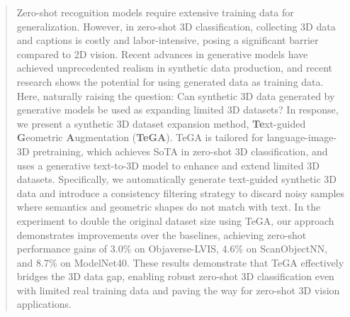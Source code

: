 \begin{abstract}

Zero-shot recognition models require extensive training data for generalization.
However, in zero-shot 3D classification, collecting 3D data and captions is costly and labor-intensive, posing a significant barrier compared to 2D vision.
Recent advances in generative models have achieved unprecedented realism in synthetic data production, and recent research shows the potential for using generated data as training data.
Here, naturally raising the question: Can synthetic 3D data generated by generative models be used as expanding limited 3D datasets? 
In response, we present a synthetic 3D dataset expansion method, \textbf{Te}xt-guided \textbf{G}eometric \textbf{A}ugmentation (\textbf{TeGA}).
TeGA is tailored for language-image-3D pretraining, which achieves SoTA in zero-shot 3D classification, and uses a generative text-to-3D model to enhance and extend limited 3D datasets.
Specifically, we automatically generate text-guided synthetic 3D data and introduce a consistency filtering strategy to discard noisy samples where semantics and geometric shapes do not match with text. 
In the experiment to double the original dataset size using TeGA, our approach demonstrates improvements over the baselines, achieving zero-shot performance gains of 3.0\% on Objaverse-LVIS, 4.6\% on ScanObjectNN, and 8.7\% on ModelNet40.
These results demonstrate that TeGA effectively bridges the 3D data gap, enabling robust zero-shot 3D classification even with limited real training data and paving the way for zero-shot 3D vision applications. 

\end{abstract}



